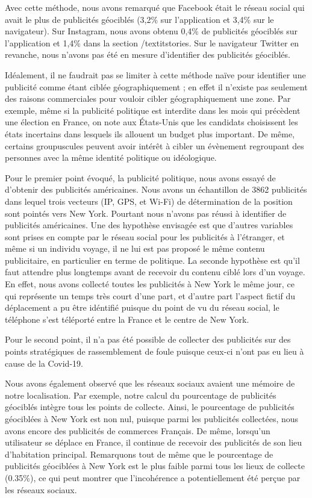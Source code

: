 \documentclass[runningheads]{llncs}
\begin{document}
Avec cette méthode, nous avons remarqué que Facebook était le réseau social qui avait le plus de publicités géociblés (3,2\% sur l'application et 3,4\% sur le navigateur). Sur Instagram, nous avons obtenu 0,4\% de publicités géociblés sur l'application et 1,4\% dans la section /textit{stories}. Sur le navigateur Twitter en revanche, nous n'avons pas été en mesure d'identifier des publicités géociblés.

Idéalement, il ne faudrait pas se limiter à cette méthode naïve pour identifier une publicité comme étant ciblée géographiquement ; en effet il n'existe pas seulement des raisons commerciales pour vouloir cibler géographiquement une zone. Par exemple, même si la publicité politique est interdite dans les mois qui précèdent une élection en France, on note aux États-Unis que les candidats choisissent les états incertains dans lesquels ils allouent un budget plus important. De même, certains groupuscules peuvent avoir intérêt à cibler un évènement regroupant des personnes avec la même identité politique ou idéologique. 

Pour le premier point évoqué, la publicité politique, nous avons essayé de d'obtenir des publicités américaines. Nous avons un échantillon de 3862 publicités dans lequel trois vecteurs (IP, GPS, et Wi-Fi) de détermination de la position sont pointés vers New York. Pourtant nous n'avons pas réussi à identifier de publicités américaines. Une des hypothèse envisagée est que d'autres variables sont prises en compte par le réseau social pour les publicités à l'étranger, et même si un individu voyage, il ne lui est pas proposé le même contenu publicitaire, en particulier en terme de politique. La seconde hypothèse est qu'il faut attendre plus longtemps avant de recevoir du contenu ciblé lors d'un voyage. En effet, nous avons collecté toutes les publicités à New York le même jour, ce qui représente un temps très court d'une part, et d'autre part l'aspect fictif du déplacement a pu être idéntifié puisque du point de vu du réseau social, le téléphone s'est téléporté entre la France et le centre de New York.

Pour le second point, il n'a pas été possible de collecter des publicités sur des points stratégiques de rassemblement de foule puisque ceux-ci n'ont pas eu lieu à cause de la Covid-19.

Nous avons également observé que les réseaux sociaux avaient une mémoire de notre localisation. Par exemple, notre calcul du pourcentage de publicités géociblés intègre tous les points de collecte. Ainsi, le pourcentage de publicités géociblées à New York est non nul, puisque parmi les publicités collectées, nous avons encore des publicités de commerces Français. De même, lorsqu'un utilisateur se déplace en France, il continue de recevoir des publicités de son lieu d'habitation principal. Remarquons tout de même que le pourcentage de publicités géociblées à New York est le plus faible parmi tous les lieux de collecte (0.35\%), ce qui peut montrer que l'incohérence a potentiellement été perçue par les réseaux sociaux.
\end{document}
